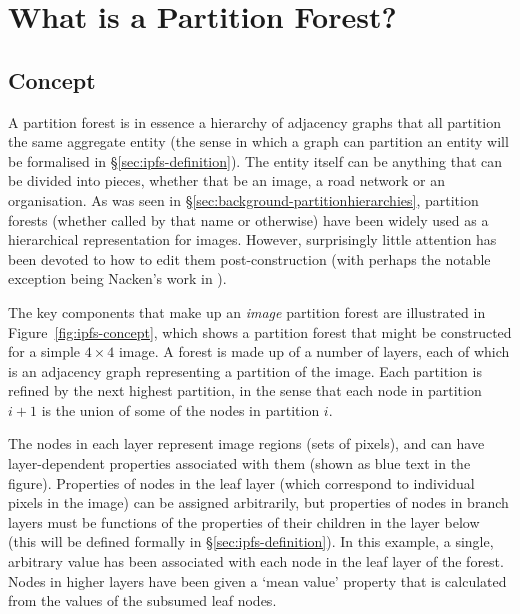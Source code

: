 \section{What is a Partition Forest?}

\subsection{Concept}


A partition forest is in essence a hierarchy of adjacency graphs that all partition the same aggregate entity (the sense in which a graph can partition an entity will be formalised in \S\ref{sec:ipfs-definition}). The entity itself can be anything that can be divided into pieces, whether that be an image, a road network or an organisation. As was seen in \S\ref{sec:background-partitionhierarchies}, partition forests (whether called by that name or otherwise) have been widely used as a hierarchical representation for images. However, surprisingly little attention has been devoted to how to edit them post-construction (with perhaps the notable exception being Nacken's work in \cite{nacken95}).

The key components that make up an \emph{image} partition forest are illustrated in Figure~\ref{fig:ipfs-concept}, which shows a partition forest that might be constructed for a simple $4 \times 4$ image. A forest is made up of a number of layers, each of which is an adjacency graph representing a partition of the image. Each partition is refined by the next highest partition, in the sense that each node in partition $i+1$ is the union of some of the nodes in partition $i$.

The nodes in each layer represent image regions (sets of pixels), and can have layer-dependent properties associated with them (shown as blue text in the figure). Properties of nodes in the leaf layer (which correspond to individual pixels in the image) can be assigned arbitrarily, but properties of nodes in branch layers must be functions of the properties of their children in the layer below (this will be defined formally in \S\ref{sec:ipfs-definition}). In this example, a single, arbitrary value has been associated with each node in the leaf layer of the forest. Nodes in higher layers have been given a `mean value' property that is calculated from the values of the subsumed leaf nodes.

